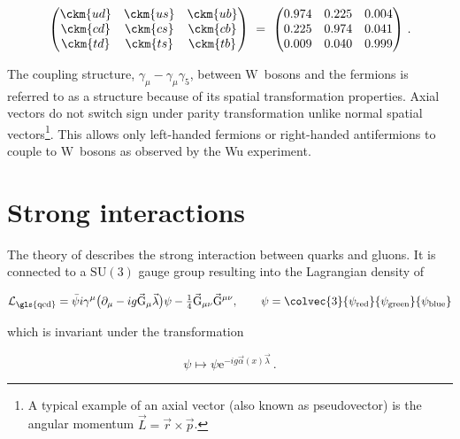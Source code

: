 \begin{equation}
\begin{pmatrix}
\ckm{ud} & \ckm{us} & \ckm{ub} \\
\ckm{cd} & \ckm{cs} & \ckm{cb} \\
\ckm{td} & \ckm{ts} & \ckm{tb} 
\end{pmatrix}
~=~
\begin{pmatrix}
0.974 & 0.225 & 0.004 \\
0.225 & 0.974 & 0.041 \\
0.009 & 0.040 & 0.999 
\end{pmatrix}\,.
\end{equation}

The coupling structure, $\gamma_{\mu}-\gamma_{\mu}\gamma_{5}$, between $\mathrm{W}$~bosons and the fermions is referred to as a  structure because of its spatial transformation properties. Axial vectors do not switch sign under parity transformation  unlike normal spatial vectors\footnote{A typical example of an axial vector (also known as pseudovector) is the angular momentum $\vec{L}=\vec{r}\times \vec{p}$.}. This allows only left-handed fermions or right-handed antifermions to couple to $\mathrm{W}$~bosons as observed by the Wu experiment.



\section{Strong interactions}
\label{sec:theory-qcd}

The theory of  describes the strong interaction between quarks and gluons. It is connected to a $\mathrm{SU(3)}$ gauge group resulting into the Lagrangian density of

\begin{align}
\mathcal{L}_\mathrm{\gls{qcd}}=\bar{\psi}i\gamma^{\mu}\big(\partial_{\mu}-ig\vec{\mathrm{G}}_\mu\vec{\lambda}\big)\psi-\tfrac{1}{4}\vec{\mathrm{G}}_{\mu\nu}\vec{\mathrm{G}}^{\mu\nu},\qquad \psi=\colvec{3}{\psi_\mathrm{red}}{\psi_\mathrm{green}}{\psi_\mathrm{blue}}
\end{align}

which is invariant under the transformation

\begin{equation}
\psi\mapsto\psi\mathrm{e}^{-ig\vec{\alpha}(x)\vec{\lambda}}\,.
\end{equation}


